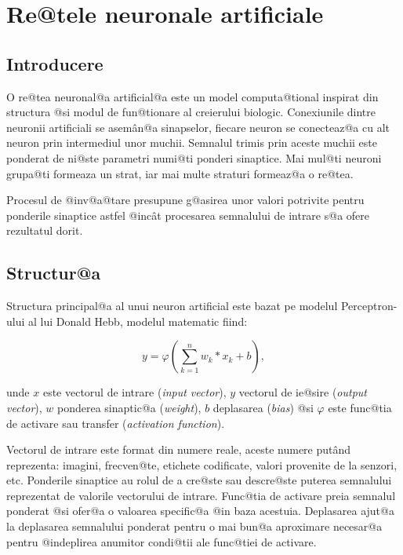 	

\chapter{Re@tele neuronale artificiale}


\section{Introducere}

O re@tea neuronal@a artificial@a este un model computa@tional inspirat din structura @si modul de fun@tionare al creierului biologic. Conexiunile dintre neuronii artificiali se asem\^ an@a sinapselor, fiecare neuron se conecteaz@a cu alt neuron prin intermediul unor muchii. Semnalul trimis prin aceste muchii este ponderat de ni@ste parametri numi@ti ponderi sinaptice. Mai mul@ti neuroni grupa@ti formeaza un strat, iar mai multe straturi formeaz@a o re@tea.

Procesul de @inv@a@tare presupune g@asirea unor valori potrivite pentru ponderile sinaptice astfel @inc\^ at procesarea semnalului de intrare s@a ofere rezultatul dorit.


\section{Structur@a}

Structura principal@a al unui neuron artificial este bazat pe modelul Perceptron-ului al lui Donald Hebb, modelul matematic fiind:

$$
	y = \varphi \left( \sum_{k=1}^{n} w_k * x_k + b \right),
$$

\indent unde $x$ este vectorul de intrare ({\sl input vector}), $y$ vectorul de ie@sire ({\sl output vector}), $w$ ponderea sinaptic@a ({\sl weight}), $b$ deplasarea ({\sl bias}) @si $\varphi$ este func@tia de activare sau transfer ({\sl activation function}).

Vectorul de intrare este format din numere reale, aceste numere put\^ and reprezenta: imagini, frecven@te, etichete codificate, valori provenite de la senzori, etc. Ponderile sinaptice au rolul de a cre@ste sau descre@ste puterea semnalului reprezentat de valorile vectorului de intrare. Func@tia de activare preia semnalul ponderat @si ofer@a o valoarea specific@a @in baza acestuia. Deplasarea ajut@a la deplasarea semnalului ponderat pentru o mai bun@a aproximare necesar@a pentru @indeplirea anumitor condi@tii ale func@tiei de activare.

